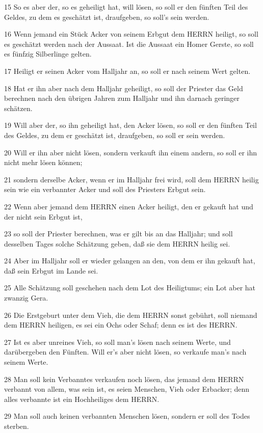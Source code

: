 \par 15 So es aber der, so es geheiligt hat, will lösen, so soll er den fünften Teil des Geldes, zu dem es geschätzt ist, draufgeben, so soll's sein werden.
\par 16 Wenn jemand ein Stück Acker von seinem Erbgut dem HERRN heiligt, so soll es geschätzt werden nach der Aussaat. Ist die Aussaat ein Homer Gerste, so soll es fünfzig Silberlinge gelten.
\par 17 Heiligt er seinen Acker vom Halljahr an, so soll er nach seinem Wert gelten.
\par 18 Hat er ihn aber nach dem Halljahr geheiligt, so soll der Priester das Geld berechnen nach den übrigen Jahren zum Halljahr und ihn darnach geringer schätzen.
\par 19 Will aber der, so ihn geheiligt hat, den Acker lösen, so soll er den fünften Teil des Geldes, zu dem er geschätzt ist, draufgeben, so soll er sein werden.
\par 20 Will er ihn aber nicht lösen, sondern verkauft ihn einem andern, so soll er ihn nicht mehr lösen können;
\par 21 sondern derselbe Acker, wenn er im Halljahr frei wird, soll dem HERRN heilig sein wie ein verbannter Acker und soll des Priesters Erbgut sein.
\par 22 Wenn aber jemand dem HERRN einen Acker heiligt, den er gekauft hat und der nicht sein Erbgut ist,
\par 23 so soll der Priester berechnen, was er gilt bis an das Halljahr; und soll desselben Tages solche Schätzung geben, daß sie dem HERRN heilig sei.
\par 24 Aber im Halljahr soll er wieder gelangen an den, von dem er ihn gekauft hat, daß sein Erbgut im Lande sei.
\par 25 Alle Schätzung soll geschehen nach dem Lot des Heiligtums; ein Lot aber hat zwanzig Gera.
\par 26 Die Erstgeburt unter dem Vieh, die dem HERRN sonst gebührt, soll niemand dem HERRN heiligen, es sei ein Ochs oder Schaf; denn es ist des HERRN.
\par 27 Ist es aber unreines Vieh, so soll man's lösen nach seinem Werte, und darübergeben den Fünften. Will er's aber nicht lösen, so verkaufe man's nach seinem Werte.
\par 28 Man soll kein Verbanntes verkaufen noch lösen, das jemand dem HERRN verbannt von allem, was sein ist, es seien Menschen, Vieh oder Erbacker; denn alles verbannte ist ein Hochheiliges dem HERRN.
\par 29 Man soll auch keinen verbannten Menschen lösen, sondern er soll des Todes sterben.
